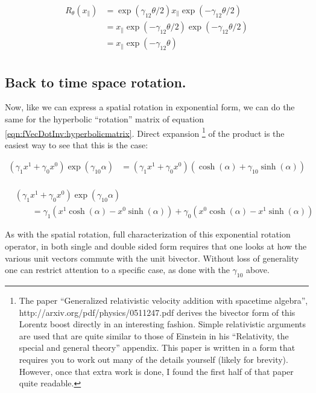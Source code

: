 \begin{align*}
R_{\theta}(x_{\parallel}) 
&= \exp( \gamma_{12}\theta/2) x_{\parallel} \exp( -\gamma_{12}\theta/2) \\
&= x_{\parallel} \exp( -\gamma_{12}\theta/2) \exp( -\gamma_{12}\theta/2) \\
&= x_{\parallel} \exp( -\gamma_{12}\theta) \\
\end{align*}

\subsection{Back to time space rotation. }

Now, like we can express a spatial rotation in exponential form, we can do the same for the hyperbolic ``rotation'' matrix of equation \ref{eqn:fVecDotInv:hyperbolicmatrix}.  Direct expansion
\footnote{
The paper ``Generalized relativistic velocity addition with spacetime algebra'', http://arxiv.org/pdf/physics/0511247.pdf derives the bivector form of this Lorentz boost directly in an interesting fashion.  Simple relativistic arguments are used that are quite similar to those of Einstein in his ``Relativity, the special and general theory'' appendix.  This paper is written in a form that requires you to work out many of the details yourself (likely for brevity).  However, once that extra work is done, I found the first half of that paper quite readable.
}
of the product is the easiest way to see that this is the case:

\begin{align*}
\left(\gamma_{1} x^1 + \gamma_{0} x^0 \right)\exp(\gamma_{10}\alpha)
&= \left(\gamma_{1} x^1 + \gamma_{0} x^0 \right) \left( \cosh(\alpha) +\gamma_{10}\sinh(\alpha) \right) \\
\end{align*}

\begin{equation}\label{eqn:fVecDotInv:lorentz}
\begin{aligned}
&\left(\gamma_{1} x^1 + \gamma_{0} x^0 \right)\exp(\gamma_{10}\alpha) \\
&\qquad = \gamma_1\left( x^1 \cosh(\alpha) - x^0 \sinh(\alpha)\right) 
 + \gamma_0\left( x^0 \cosh(\alpha) - x^1 \sinh(\alpha)\right)
\end{aligned}
\end{equation}

As with the spatial rotation, full characterization of this exponential rotation operator, in both single and double sided form requires that one looks at how the various unit vectors commute with the unit bivector.  Without loss of generality one can restrict attention to a specific case, as done with the $\gamma_{10}$ above.

